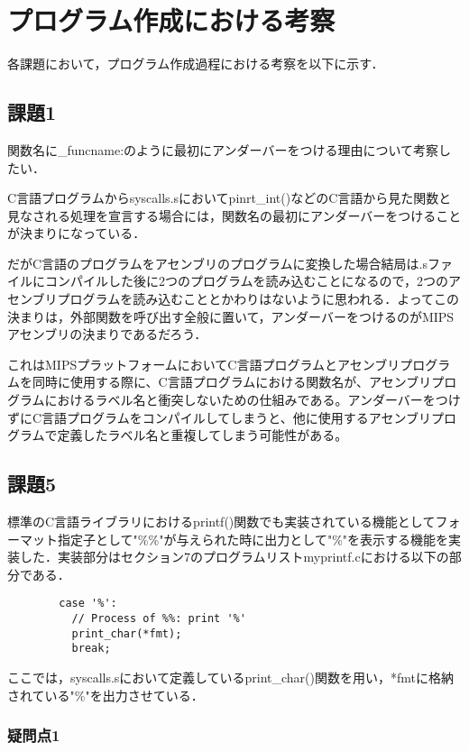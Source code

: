 \documentclass[a4j]{jarticle}
\begin{document}
%
%

\section{プログラム作成における考察}

各課題において，プログラム作成過程における考察を以下に示す．

\subsection{課題1}

関数名に\_funcname:のように最初にアンダーバーをつける理由について考察したい．

C言語プログラムからsyscalls.sにおいてpinrt\_int()などのC言語から見た関数と見なされる処理を宣言する場合には，関数名の最初にアンダーバーをつけることが決まりになっている．

だがC言語のプログラムをアセンブリのプログラムに変換した場合結局は.sファイルにコンパイルした後に2つのプログラムを読み込むことになるので，2つのアセンブリプログラムを読み込むこととかわりはないように思われる．よってこの決まりは，外部関数を呼び出す全般に置いて，アンダーバーをつけるのがMIPSアセンブリの決まりであるだろう．

これはMIPSプラットフォームにおいてC言語プログラムとアセンブリプログラムを同時に使用する際に、C言語プログラムにおける関数名が、アセンブリプログラムにおけるラベル名と衝突しないための仕組みである。アンダーバーをつけずにC言語プログラムをコンパイルしてしまうと、他に使用するアセンブリプログラムで定義したラベル名と重複してしまう可能性がある。


\subsection{課題5}

標準のC言語ライブラリにおけるprintf()関数でも実装されている機能としてフォーマット指定子として"\%\%"が与えられた時に出力として"\%"を表示する機能を実装した．実装部分はセクション7のプログラムリストmyprintf.cにおける以下の部分である．

\begin{verbatim}
        case '%':
          // Process of %%: print '%'
          print_char(*fmt);
          break;
\end{verbatim}

ここでは，syscalls.sにおいて定義しているprint\_char()関数を用い，*fmtに格納されている"\%"を出力させている．

\subsubsection{疑問点1}
\end{document}
